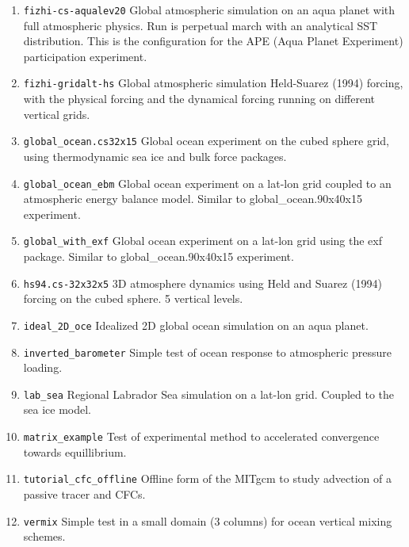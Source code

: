 \begin{enumerate}
\item \texttt{fizhi-cs-aqualev20} Global atmospheric simulation on an aqua planet with
  full atmospheric physics. Run is perpetual march with an analytical SST distribution.
  This is the configuration for the APE (Aqua Planet Experiment) participation experiment.

\item \texttt{fizhi-gridalt-hs} Global atmospheric simulation Held-Suarez (1994) forcing,
  with the physical forcing and the dynamical forcing running on different vertical grids.

\item \texttt{global_ocean.cs32x15} Global ocean experiment on the cubed sphere grid, using
thermodynamic sea ice and bulk force packages.

\item \texttt{global_ocean_ebm} Global ocean experiment on a lat-lon grid coupled to an
atmospheric energy balance model. Similar to global_ocean.90x40x15 experiment.

\item \texttt{global_with_exf} Global ocean experiment on a lat-lon grid using the exf
package. Similar to global_ocean.90x40x15 experiment.

\item \texttt{hs94.cs-32x32x5} 3D atmosphere dynamics using Held and Suarez
  (1994) forcing on the cubed sphere. 5 vertical levels.

\item \texttt{ideal_2D_oce} Idealized 2D global ocean simulation on an aqua planet.

\item \texttt{inverted_barometer} Simple test of ocean response to atmospheric pressure
loading.

\item \texttt{lab_sea} Regional Labrador Sea simulation on a lat-lon grid. Coupled to
the sea ice model.

\item \texttt{matrix_example} Test of experimental method to accelerated convergence towards
equillibrium.

\item \texttt{tutorial_cfc_offline} Offline form of the MITgcm to study advection of a passive
  tracer and CFCs.

\item \texttt{vermix} Simple test in a small domain (3 columns) for ocean vertical mixing schemes.

\end{enumerate}

